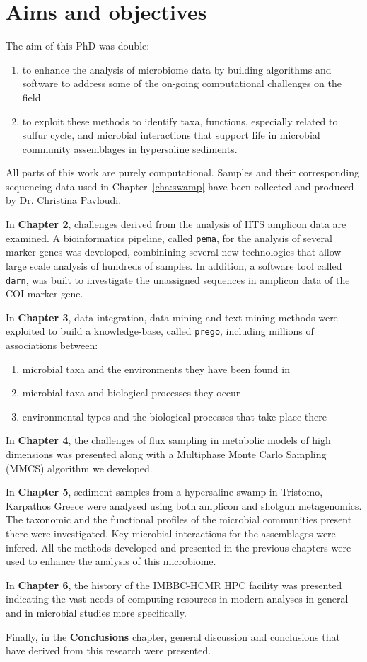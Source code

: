 \section{Aims and objectives}

The aim of this PhD was double:
\begin{enumerate}
   \item to enhance the analysis of microbiome data by building algorithms and software to address some of the on-going computational challenges on the field.
   \item to exploit these methods to identify taxa, functions, especially related to sulfur cycle, and microbial interactions that support life in microbial community assemblages in hypersaline sediments.
\end{enumerate}
All parts of this work are purely computational. Samples and their corresponding sequencing data used in Chapter~\ref{cha:swamp} have been collected and produced by \href{}{Dr. Christina Pavloudi}. 

In \textbf{Chapter 2}, challenges derived from the analysis of HTS amplicon data are examined.
A bioinformatics pipeline, called \texttt{pema}, for the analysis of several marker genes was developed, combinining several new technologies that allow large scale analysis of hundreds of samples. 
In addition, a software tool called \texttt{darn}, was built to investigate the unassigned sequences in amplicon data of the COI marker gene. 

In \textbf{Chapter 3}, data integration, data mining and text-mining methods were exploited to build a knowledge-base, called \texttt{prego}, including millions of associations between:
\begin{enumerate}
   \item microbial taxa and the environments they have been found in 
   \item microbial taxa and biological processes they occur
   \item environmental types and the biological processes that take place there
\end{enumerate}

In \textbf{Chapter 4}, the challenges of flux sampling in metabolic models of high dimensions was presented along with a Multiphase Monte Carlo Sampling (MMCS) algorithm we developed. 

In \textbf{Chapter 5}, sediment samples from a hypersaline swamp in Tristomo, Karpathos Greece were analysed using both amplicon and shotgun metagenomics. 
The taxonomic and the functional profiles of the microbial communities present there were investigated. 
Key microbial interactions for the assemblages were infered. 
All the methods developed and presented in the previous chapters were used to enhance the analysis of this microbiome.

In \textbf{Chapter 6}, the history of the IMBBC-HCMR HPC facility was presented indicating the vast needs of computing resources in modern analyses in general and in microbial studies more specifically. 


Finally, in the \textbf{Conclusions} chapter, general discussion and conclusions that have derived from this research were presented. 

